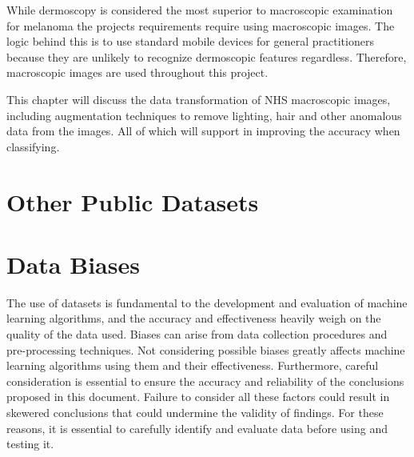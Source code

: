While dermoscopy is considered the most superior to macroscopic examination for melanoma the projects requirements require using macroscopic images. The logic behind this is to use standard mobile devices for general practitioners because they are unlikely to recognize dermoscopic features regardless. Therefore, macroscopic images are used throughout this project.

This chapter will discuss the data transformation of NHS macroscopic images, including augmentation techniques to remove lighting, hair and other anomalous data from the images. All of which will support in improving the accuracy when classifying.



\section{Other Public Datasets}

\section{Data Biases}
The use of datasets is fundamental to the development and evaluation of machine learning algorithms, and the accuracy and effectiveness heavily weigh on the quality of the data used. Biases can arise from data collection procedures and pre-processing techniques. Not considering possible biases greatly affects machine learning algorithms using them and their effectiveness. Furthermore, careful consideration is essential to ensure the accuracy and reliability of the conclusions proposed in this document. Failure to consider all these factors could result in skewered conclusions that could undermine the validity of findings. For these reasons, it is essential to carefully identify and evaluate data before using and testing it.

